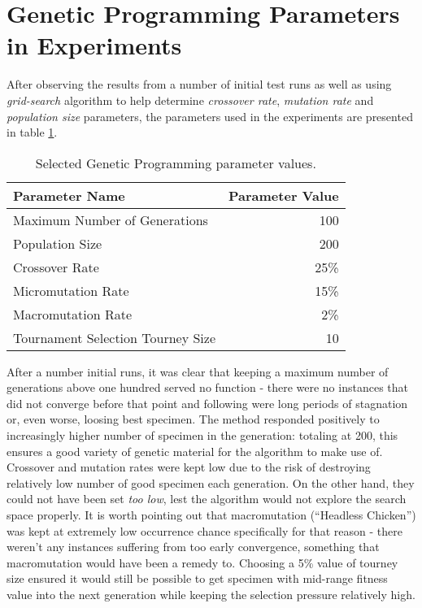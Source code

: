 \section{Genetic Programming Parameters in Experiments}
After observing the results from a number of initial test runs as well as using \textit{grid-search} algorithm to help determine \textit{crossover rate}, \textit{mutation rate} and \textit{population size} parameters, the parameters used in the experiments are presented in table \ref{table:x selectedgpparameters}.

\begin{table} [h]
    \centering
    \begin{tabular} {l r}
        \hline \hline
        Parameter Name & Parameter Value \\
        \hline
        Maximum Number of Generations & 100 \\
        Population Size & 200 \\
        Crossover Rate & 25\% \\
        Micromutation Rate & 15\% \\
        Macromutation Rate & 2\% \\
        Tournament Selection Tourney Size & 10 \\
    \end{tabular}
    \caption{Selected Genetic Programming parameter values.}
    \label{table:x selectedgpparameters}
\end{table}

After a number initial runs, it was clear that keeping a maximum number of generations above one hundred served no function - there were no instances that did not converge before that point and following were long periods of stagnation or, even worse, loosing best specimen. The method responded positively to increasingly higher number of specimen in the generation: totaling at 200, this ensures a good variety of genetic material for the algorithm to make use of. Crossover and mutation rates were kept low due to the risk of destroying relatively low number of good specimen each generation. On the other hand, they could not have been set \textit{too low}, lest the algorithm would not explore the search space properly. It is worth pointing out that macromutation (``Headless Chicken'') was kept at extremely low occurrence chance specifically for that reason - there weren't any instances suffering from too early convergence, something that macromutation would have been a remedy to. Choosing a 5\% value of tourney size ensured it would still be possible to get specimen with mid-range fitness value into the next generation while keeping the selection pressure relatively high.


